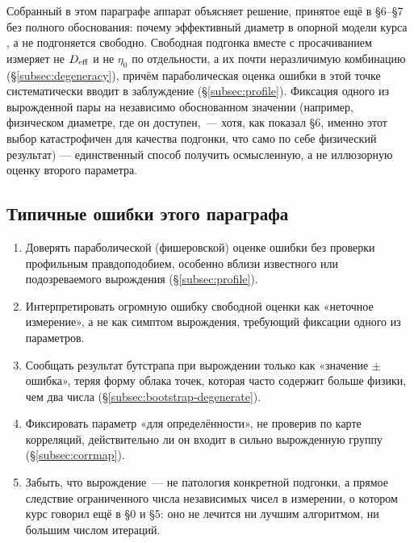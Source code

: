 \begin{tcolorbox}[enhanced,colback=cS1!7,colframe=cS1,boxrule=0pt,leftrule=3pt,arc=1pt]
Собранный в этом параграфе аппарат объясняет решение, принятое ещё в §6--§7 без полного
обоснования: почему эффективный диаметр в опорной модели курса , а не
подгоняется свободно. Свободная подгонка вместе с просачиванием измеряет не $D_{\mathrm{eff}}$ и не
$\eta_0$ по отдельности, а их почти неразличимую комбинацию (§\ref{subsec:degeneracy}), причём
параболическая оценка ошибки в этой точке систематически вводит в заблуждение
(§\ref{subsec:profile}). Фиксация одного из вырожденной пары на независимо обоснованном значении
(например, физическом диаметре, где он доступен,~--- хотя, как показал §6, именно этот выбор
катастрофичен для качества подгонки, что само по себе физический результат) — единственный
способ получить осмысленную, а не иллюзорную оценку второго параметра.
\end{tcolorbox}

\subsection{Типичные ошибки этого параграфа}

\begin{enumerate}[leftmargin=1.6em,itemsep=0.25em]
  \item Доверять параболической (фишеровской) оценке ошибки без проверки профильным
        правдоподобием, особенно вблизи известного или подозреваемого вырождения
        (§\ref{subsec:profile}).
  \item Интерпретировать огромную ошибку свободной оценки как «неточное измерение», а не как
        симптом вырождения, требующий фиксации одного из параметров.
  \item Сообщать результат бутстрапа при вырождении только как «значение $\pm$ ошибка», теряя
        форму облака точек, которая часто содержит больше физики, чем два числа
        (§\ref{subsec:bootstrap-degenerate}).
  \item Фиксировать параметр «для определённости», не проверив по карте корреляций, действительно
        ли он входит в сильно вырожденную группу (§\ref{subsec:corrmap}).
  \item Забыть, что вырождение~--- не патология конкретной подгонки, а прямое следствие
        ограниченного числа независимых чисел в измерении, о котором курс говорил ещё в §0 и §5:
        оно не лечится ни лучшим алгоритмом, ни большим числом итераций.
\end{enumerate}

\clearpage

